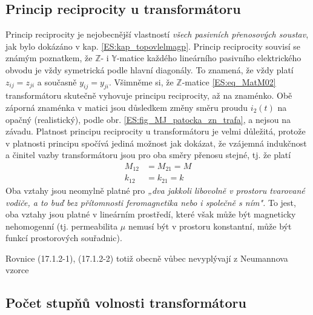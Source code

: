           
         
    \subsection{Princip reciprocity u transformátoru}
      Princip reciprocity je nejobecnější vlastností \emph{všech pasivních přenosových soustav}, jak bylo 
      dokázáno v kap. \ref{ES:kap_topovlelmagp}. Princip reciprocity souvisí se známým poznatkem, že 
      \(\mathbb{Z}\)- i \(\mathbb{Y}\)-matice každého lineárního pasivního elektrického obvodu je vždy 
      symetrická podle hlavní diagonály. To znamená, že vždy platí \(z_{ij} = z_{ji}\) a současně \(y_{ij} = 
      y_{ji}\). Všimněme si, že \(\mathbb{Z}\)-matice \ref{ES:eq_MatM02} transformátoru skutečně vyhovuje 
      principu reciprocity, až na znaménko. Obě záporná znaménka v matici jsou důsledkem změny směru proudu 
      \(i_2(t)\) na opačný (realistický), podle obr. \ref{ES:fig_MJ_patocka_zn_trafa}, a nejsou na závadu. 
      Platnost principu reciprocity u transformátoru je velmi důležitá, protože v platnosti principu spočívá 
      jediná možnost jak dokázat, že vzájemná indukčnost a činitel vazby transformátoru jsou pro oba směry 
      přenosu stejné, tj. že platí
      \begin{align}
        M_{12} &= M_{21} = M  \\
        k_{12} &= k_{21} = k
      \end{align}
      Oba vztahy jsou neomylně platné pro \emph{„dva jakkoli libovolně v prostoru tvarované vodiče, a to buď 
      bez přítomnosti feromagnetika nebo i společně s ním".} To jest, oba vztahy jsou platné v lineárním 
      prostředí, které však může být magneticky nehomogenní (tj. permeabilita \(\mu\) nemusí být v prostoru 
      konstantní, může být funkcí prostorových souřadnic).
	  
	  \begin{note}
	    Rovnice (17.1.2-1), (17.1.2-2) totiž obecně vůbec nevyplývají z Neumannova vzorce
	  \end{note}    
    \subsection{Počet stupňů volnosti transformátoru}


